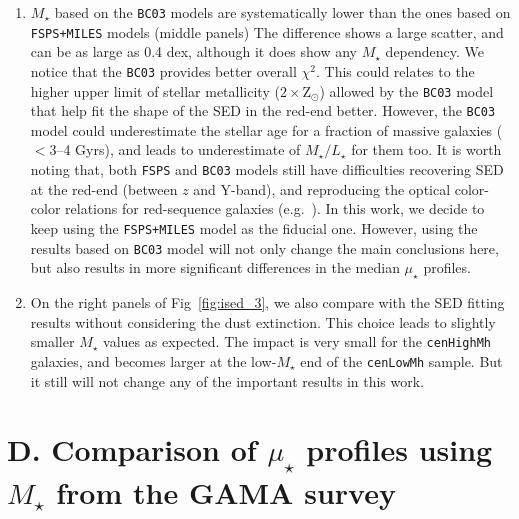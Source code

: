 \documentclass{emulateapj}
\def\rbcg{\texttt{cenHighMh}}
\def\nbcg{\texttt{cenLowMh}}
\def\mstar{{$M_{\star}$}}
\def\m2l{{$M_{\star}/L_{\star}$}}
\def\mden{{$\mu_{\star}$}}
\begin{document}
\begin{CJK*}{UTF8}{gbsn}
\begin{enumerate}
        \item \mstar{} based on the \texttt{BC03} models are systematically lower 
            than the ones based on \texttt{FSPS+MILES} models (middle panels)
            The difference shows a large scatter, and can be as large as 0.4 dex,
            although it does show any \mstar{} dependency. 
            We notice that the \texttt{BC03} provides better overall ${\chi}^2$. 
            This could relates to the higher upper limit of stellar metallicity 
            ($2 \times \mathrm{Z}_{\odot}$) allowed by the \texttt{BC03} model 
            that help fit the shape of the SED in the red-end better.  
            However, the \texttt{BC03} model could underestimate the 
            stellar age for a fraction of massive galaxies ($< 3$--4 Gyrs), and 
            leads to underestimate of  \m2l{} for them too.
            It is worth noting that, both \texttt{FSPS} and \texttt{BC03} 
            models still have difficulties recovering SED at the red-end (between $z$ 
            and Y-band), and reproducing the optical color-color relations for 
            red-sequence galaxies (e.g.\ \citealt{MIUSCAT2}).
            In this work, we decide to keep using the \texttt{FSPS+MILES} model as 
            the fiducial one.  
            However, using the results based on \texttt{BC03} model will not 
            only change the main conclusions here, but also results in more 
            significant differences in the median \mden{} profiles.
            
        \item On the right panels of Fig~\ref{fig:ised_3}, we also compare with the
            SED fitting results without considering the dust extinction. 
            This choice leads to slightly smaller \mstar{} values as expected. 
            The impact is very small for the \rbcg{} galaxies, and becomes larger 
            at the low-\mstar{} end of the \nbcg{} sample. 
            But it still will not change any of the important results in this work.
          
    \end{enumerate}

\section{D. Comparison of \mden{} profiles using \mstar{} from the GAMA survey}
    \label{app:gama} 


\end{CJK*}
\end{document}
